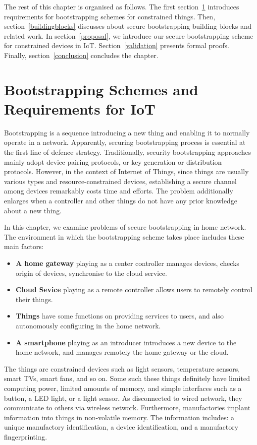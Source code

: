 The rest of this chapter is organised as follows. The first section~\ref{5intro} introduces requirements for bootstrapping schemes for constrained things. Then, section~\ref{buildingblocks} discusses about secure bootstrapping building blocks and related work. In section~\ref{proposal}, we introduce our secure bootstrapping scheme for constrained devices in IoT. Section~\ref{validation} presents formal proofs. Finally, section~\ref{conclusion} concludes the chapter. 

\section{Bootstrapping Schemes and Requirements for IoT}\label{5intro}

Bootstrapping is a sequence introducing a new thing and enabling it to normally operate in a network. Apparently, securing bootstrapping process is essential at the first line of defence strategy. Traditionally, security bootstrapping approaches mainly adopt device pairing protocols, or key generation or distribution protocols. However, in the context of Internet of Things, since things are usually various types and resource-constrained devices, establishing a secure channel among devices remarkably costs time and efforts. The problem additionally enlarges when a controller and other things do not have any prior knowledge about a new thing.

In this chapter, we examine problems of secure bootstrapping in home network. The environment in which the bootstrapping scheme takes place includes these main factors:
\begin{itemize}
\item \textbf{A home gateway} playing as a center controller manages devices, checks origin of devices, synchronise to the cloud service.
\item \textbf{Cloud Sevice} playing as a remote controller allows users to remotely control their things. 
\item \textbf{Things} have some functions on providing services to users, and also autonomously configuring in the home network.
\item \textbf{A smartphone} playing as an introducer introduces a new device to the home network, and manages remotely the home gateway or the cloud.
\end{itemize}

The things are constrained devices such as light sensors, temperature sensors, smart TVs, smart fans, and so on. Some such these things definitely have limited computing power, limited amounts of memory, and simple interfaces such as a button, a LED light, or a light sensor. As disconnected to wired network, they communicate to others via wireless network. Furthermore, manufactories implant information into things in non-volatile memory. The information includes: a unique manufactory identification, a device identification, and a manufactory fingerprinting.

